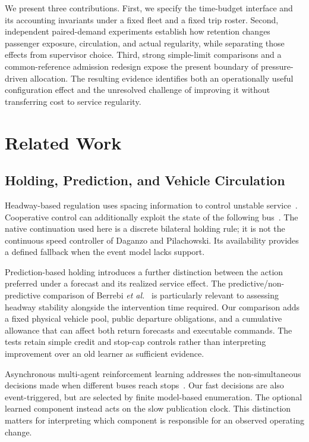 We present three contributions. First, we specify the time-budget interface and its accounting invariants under a fixed fleet and a fixed trip roster. Second, independent paired-demand experiments establish how retention changes passenger exposure, circulation, and actual regularity, while separating those effects from supervisor choice. Third, strong simple-limit comparisons and a common-reference admission redesign expose the present boundary of pressure-driven allocation. The resulting evidence identifies both an operationally useful configuration effect and the unresolved challenge of improving it without transferring cost to service regularity.

\section{Related Work}
\subsection{Holding, Prediction, and Vehicle Circulation}
Headway-based regulation uses spacing information to control unstable service~\cite{daganzo2009headway}. Cooperative control can additionally exploit the state of the following bus~\cite{daganzo2011cooperation}. The native continuation used here is a discrete bilateral holding rule; it is not the continuous speed controller of Daganzo and Pilachowski. Its availability provides a defined fallback when the event model lacks support.

Prediction-based holding introduces a further distinction between the action preferred under a forecast and its realized service effect. The predictive/non-predictive comparison of Berrebi \emph{et al.}~\cite{berrebi2018comparing} is particularly relevant to assessing headway stability alongside the intervention time required. Our comparison adds a fixed physical vehicle pool, public departure obligations, and a cumulative allowance that can affect both return forecasts and executable commands. The tests retain simple credit and stop-cap controls rather than interpreting improvement over an old learner as sufficient evidence.

Asynchronous multi-agent reinforcement learning addresses the non-simultaneous decisions made when different buses reach stops~\cite{wang2021asynchronous}. Our fast decisions are also event-triggered, but are selected by finite model-based enumeration. The optional learned component instead acts on the slow publication clock. This distinction matters for interpreting which component is responsible for an observed operating change.

